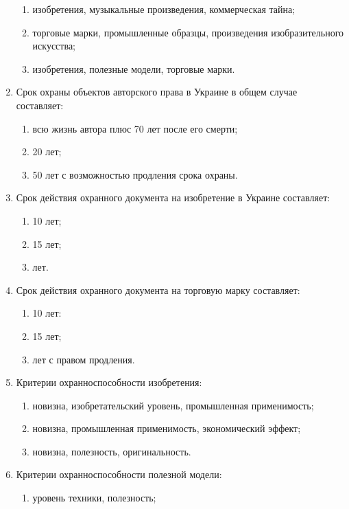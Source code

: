 \begin{enumerate}
    \begin{enumerate}
        \item изобретения, музыкальные произведения, коммерческая тайна;
        \item торговые марки, промышленные образцы, произведения изобразительного искусства;
        \item \cmark изобретения, полезные модели, торговые марки.
    \end{enumerate}
    \item Срок охраны объектов авторского права в Украине в общем случае составляет:
    \begin{enumerate}
        \item \cmark всю жизнь автора плюс 70 лет после его смерти;
        \item 20 лет;
        \item 50 лет с возможностью продления срока охраны.
    \end{enumerate}
    \item Срок действия охранного документа на изобретение в Украине составляет:
    \begin{enumerate}
        \item 10 лет;
        \item 15 лет;
        \item {} лет.
    \end{enumerate}
    \item Срок действия охранного документа на торговую марку составляет:
    \begin{enumerate}
        \item 10 лет:
        \item 15 лет;
        \item {} лет с правом продления.
    \end{enumerate}
    \item Критерии охранноспособности  изобретения:
    \begin{enumerate}
        \item \cmark новизна, изобретательский уровень, промышленная применимость;
        \item новизна, промышленная применимость, экономический эффект;
        \item новизна, полезность, оригинальность.
    \end{enumerate}
    \item Критерии охранноспособности полезной модели:
    \begin{enumerate}
        \item уровень техники, полезность;

\end{enumerate}
\end{enumerate}
